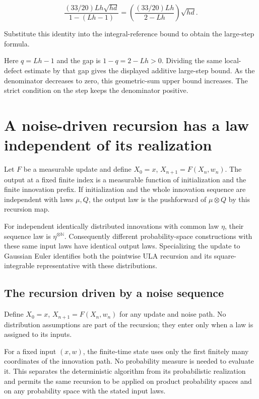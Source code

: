 \documentclass[11pt,a4paper]{report}
\begin{document}
\[\frac{(33/20)Lh\sqrt{hd}}{1-(Lh-1)}=\left(\frac{(33/20)Lh}{2-Lh}\right)\sqrt{hd}.\]

Substitute this identity into the integral-reference bound to obtain the large-step formula.



Here \(q=Lh-1\) and the gap is \(1-q=2-Lh>0\). Dividing the same local-defect estimate by that gap gives the displayed additive large-step bound. As the denominator decreases to zero, this geometric-sum upper bound increases. The strict condition on the step keeps the denominator positive.

\section{\texorpdfstring{A noise-driven recursion has a law independent of its realization}{A noise-driven recursion has a law independent of its realization}}
\label{proof-module-UnadjustedLangevin-ChainLaw-lean}


Let \(F\) be a measurable update and define \(X_0=x\), \(X_{n+1}=F(X_n,w_n)\). The output at a fixed finite index is a measurable function of initialization and the finite innovation prefix. If initialization and the whole innovation sequence are independent with laws \(\mu,Q\), the output law is the pushforward of \(\mu\otimes Q\) by this recursion map.



For independent identically distributed innovations with common law \(\eta\), their sequence law is \(\eta^{\otimes\mathbb N}\). Consequently different probability-space constructions with these same input laws have identical output laws. Specializing the update to Gaussian Euler identifies both the pointwise ULA recursion and its square-integrable representative with these distributions.

\subsection{\texorpdfstring{The recursion driven by a noise sequence}{The recursion driven by a noise sequence}}
\label{report-step-UnadjustedLangevin-ChainLaw-lean-1}


Define \(X_0=x\), \(X_{n+1}=F(X_n,w_n)\) for any update and noise path. No distribution assumptions are part of the recursion; they enter only when a law is assigned to its inputs.



For a fixed input \((x,w)\), the finite-time state uses only the first finitely many coordinates of the innovation path. No probability measure is needed to evaluate it. This separates the deterministic algorithm from its probabilistic realization and permits the same recursion to be applied on product probability spaces and on any probability space with the stated input laws.
\end{document}
